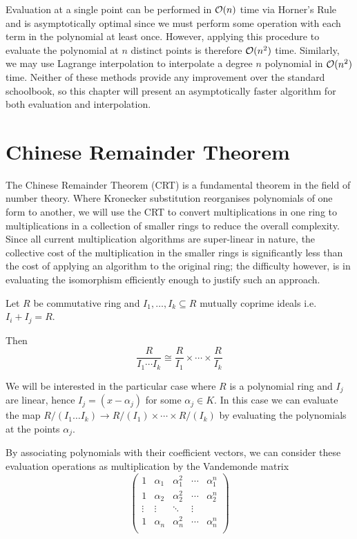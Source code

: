 \medskip

Evaluation at a single point can be performed in $\mathcal O(n)$ time via Horner's Rule and is asymptotically optimal since we must perform some operation with each term in the polynomial at least once. However, applying this procedure to evaluate the polynomial at $n$ distinct points is therefore $\mathcal O(n^2)$ time. Similarly, we may use Lagrange interpolation to interpolate a degree $n$ polynomial in $\mathcal O(n^2)$ time. Neither of these methods provide any improvement over the standard schoolbook, so this chapter will present an asymptotically faster algorithm for both evaluation and interpolation.

\section{Chinese Remainder Theorem}%
\label{sec:crt}

The Chinese Remainder Theorem (CRT) is a fundamental theorem in the field of number theory. Where Kronecker substitution reorganises polynomials of one form to another, we will use the CRT to convert multiplications in one ring to multiplications in a collection of smaller rings to reduce the overall complexity. Since all current multiplication algorithms are super-linear in nature, the collective cost of the multiplication in the smaller rings is significantly less than the cost of applying an algorithm to the original ring; the difficulty however, is in evaluating the isomorphism efficiently enough to justify such an approach.

\begin{theorem}
    Let $R$ be commutative ring and $I_1, \ldots, I_k \subseteq R$ mutually coprime ideals i.e. $I_i + I_j = R$.

    Then
    \[
        \frac{R}{I_1\cdots I_k} \cong \frac{R}{I_1} \times \cdots \times \frac{R}{I_k}
    \]
\end{theorem}

\medskip

We will be interested in the particular case where $R$ is a polynomial ring and $I_j$ are linear, hence $I_j = (x - \alpha_j)$ for some $\alpha_j \in K$. In this case we can evaluate the map $R/(I_1\ldots I_k) \to R/(I_1) \times \cdots \times R/(I_k)$ by evaluating the polynomials at the points $\alpha_j$.

By associating polynomials with their coefficient vectors, we can consider these evaluation operations as multiplication by the Vandemonde matrix
\[
  \begin{pmatrix}
      1 & \alpha_1 & \alpha_1^2 & \cdots & \alpha_1^n\\
      1 & \alpha_2 & \alpha_2^2 & \cdots & \alpha_2^n\\
      \vdots & \vdots & \ddots & \vdots\\
      1 & \alpha_n & \alpha_n^2 & \cdots & \alpha_n^n\\
  \end{pmatrix}
\]

